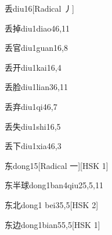 \begin{entry}{丢}{diu1}{6}[Radical 丿]
\end{entry}

\begin{entry}{丢掉}{diu1diao4}{6,11}
\end{entry}

\begin{entry}{丢官}{diu1guan1}{6,8}
\end{entry}

\begin{entry}{丢开}{diu1kai1}{6,4}
\end{entry}

\begin{entry}{丢脸}{diu1lian3}{6,11}
\end{entry}

\begin{entry}{丢弃}{diu1qi4}{6,7}
\end{entry}

\begin{entry}{丢失}{diu1shi1}{6,5}
\end{entry}

\begin{entry}{丢下}{diu1xia4}{6,3}
\end{entry}

\begin{entry}{东}{dong1}{5}[Radical ⼀][HSK 1]
\end{entry}

\begin{entry}{东半球}{dong1ban4qiu2}{5,5,11}
\end{entry}

\begin{entry}{东北}{dong1 bei3}{5,5}[HSK 2]
\end{entry}

\begin{entry}{东边}{dong1bian5}{5,5}[HSK 1]
\end{entry}

